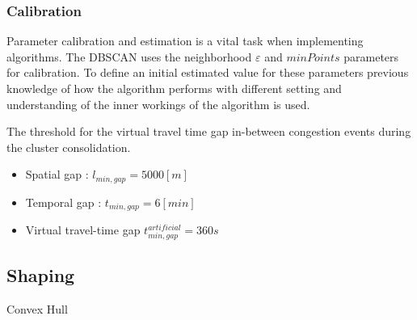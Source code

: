 \documentclass[a4paper,headsepline,footsepline,fontsize=11pt,BCOR=12mm,DIV=12]{report}
\begin{document}

\subsubsection{Calibration}
Parameter calibration and estimation is a vital task when implementing algorithms. The DBSCAN uses the neighborhood $\varepsilon$ and $minPoints$ parameters for calibration. To define an initial estimated value for these parameters previous knowledge of how the algorithm performs with different setting and understanding of the inner workings of the algorithm is used.


The threshold for the virtual travel time gap in-between congestion events during the cluster consolidation. 
\begin{itemize}
	\item Spatial gap : $l_{min,gap} = 5000 [m]$ %
	\item Temporal gap : $t_{min,gap} = 6 [min]$ %
	\item Virtual travel-time gap $t_{min,gap}^{artificial} = 360s$
\end{itemize}


\subsection{Shaping}
\label{methodology_shaping}

Convex Hull
\begin{figure}[h]
	\centering
\end{figure}
\end{document}
